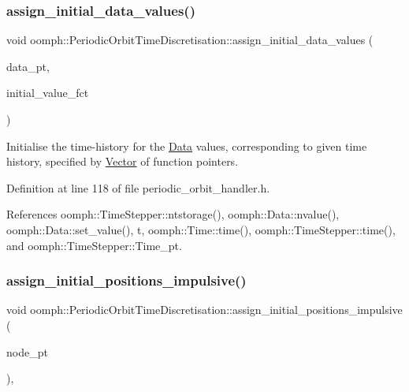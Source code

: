 \subsubsection{\texorpdfstring{assign\+\_\+initial\+\_\+data\+\_\+values()}{assign\_initial\_data\_values()}}
{\footnotesize\ttfamily void oomph\+::\+Periodic\+Orbit\+Time\+Discretisation\+::assign\+\_\+initial\+\_\+data\+\_\+values (\begin{DoxyParamCaption}\item[{\hyperlink{classoomph_1_1Data}{Data} $\ast$const \&}]{data\+\_\+pt,  }\item[{\hyperlink{classoomph_1_1Vector}{Vector}$<$ \hyperlink{classoomph_1_1PeriodicOrbitTimeDiscretisation_a0bccd8d239689d95cf7422d877a5eed8}{Initial\+Condition\+Fct\+Pt} $>$}]{initial\+\_\+value\+\_\+fct }\end{DoxyParamCaption})\hspace{0.3cm}{\ttfamily [inline]}}



Initialise the time-\/history for the \hyperlink{classoomph_1_1Data}{Data} values, corresponding to given time history, specified by \hyperlink{classoomph_1_1Vector}{Vector} of function pointers. 



Definition at line 118 of file periodic\+\_\+orbit\+\_\+handler.\+h.



References oomph\+::\+Time\+Stepper\+::ntstorage(), oomph\+::\+Data\+::nvalue(), oomph\+::\+Data\+::set\+\_\+value(), t, oomph\+::\+Time\+::time(), oomph\+::\+Time\+Stepper\+::time(), and oomph\+::\+Time\+Stepper\+::\+Time\+\_\+pt.

\mbox{\label{classoomph_1_1PeriodicOrbitTimeDiscretisation_ab0445858504afb534970431e8bf2d3c6}} 
\subsubsection{\texorpdfstring{assign\+\_\+initial\+\_\+positions\+\_\+impulsive()}{assign\_initial\_positions\_impulsive()}}
{\footnotesize\ttfamily void oomph\+::\+Periodic\+Orbit\+Time\+Discretisation\+::assign\+\_\+initial\+\_\+positions\+\_\+impulsive (\begin{DoxyParamCaption}\item[{\hyperlink{classoomph_1_1Node}{Node} $\ast$const \&}]{node\+\_\+pt }\end{DoxyParamCaption})\hspace{0.3cm}{\ttfamily [inline]}, {\ttfamily [virtual]}}



